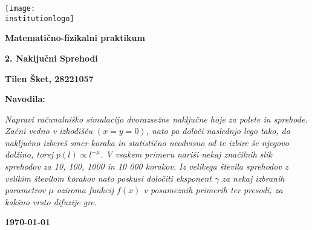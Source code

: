 \newcommand{\institutionname}{Univerza v Ljubljani}
\newcommand{\projecttitle}{2. Naključni Sprehodi}
\newcommand{\authorname}{Tilen Šket, 28221057}
\newcommand{\instructions}{\textit{
        Napravi računalniško simulacijo dvorazsežne naključne hoje za polete in sprehode. Začni vedno v izhodišču $(x = y = 0)$, nato pa določi naslednjo lego tako, da naključno
        izbereš smer koraka in statistično neodvisno od te izbire še njegovo dolžino, torej
        $p(l) \propto l^{-\mu}$.
        V vsakem primeru nariši nekaj značilnih slik sprehodov za 10, 100, 1000
        in 10 000 korakov. Iz velikega števila sprehodov z velikim številom korakov nato poskusi določiti eksponent $\gamma$ za nekaj izbranih parametrov $\mu$ oziroma funkcij $f(x)$ v posameznih primerih ter presodi, za kakšno vrsto difuzije gre.
    }}
\newcommand{\subjectname}{Matematično-fizikalni praktikum}
\newcommand{\institutionlogo}{UlFmf_logo.pdf}

\begin{titlepage}
    \centering

    \texttt{[image: \\institutionlogo]}

    \vspace{1.0cm}

    \Large
    \textbf{\subjectname}

    \vspace{1.0cm}

    \LARGE
    \textbf{\projecttitle}

    \vspace{1.0cm}

    \Large
    \textbf{\authorname}

    \vfill

    \large
    \textbf{Navodila:}

    \vspace{0.5cm}

    \large
    \instructions%

    \vspace{0.5cm}
    \vfill

    \large
    \textbf{\today}

\end{titlepage}
